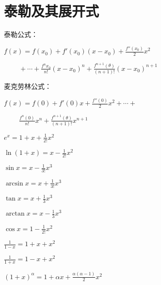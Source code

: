 \section{泰勒及其展开式}

{
    \noindent 泰勒公式：

    $\displaystyle f(x) = f(x_0) + f'(x_0)(x-x_0) + \frac{f''(x_0)}{2} x^2$

    $\displaystyle \qquad \  + \cdots + \frac{f^{n}x_0}{n!} (x-x_0)^n + \frac{f^{n+1}(\theta)}{(n+1)!}(x - x_0)^{n+1}$
}


{
    \noindent 麦克劳林公式：

    $\displaystyle f(x) = f(0) + f'(0)x + \frac{f''(0)}{2} x^2 + \cdots +$

    $\displaystyle \qquad \ \frac{f^{n}(0)}{n!} x^n + \frac{f^{n+1}(\theta)}{(n+1)!}x^{n+1}$
}

\begin{multicols}{2}
    \begin{spacing}{\hangju}
        \noindent $e^x = 1 + x + \frac{1}{2!}x^2$

        \noindent $\ln{(1 + x)} = x - \frac{1}{2!}x^2$

        \noindent $\sin{x} = x - \frac{1}{3!}x^{3}$

        \noindent $\arcsin{x} = x + \frac{1}{3!}x^{3}$

        \noindent $\tan{x} = x + \frac{1}{3}x^3$

        \noindent $\arctan{x} = x - \frac{1}{3}x^3$

        \noindent $\cos{x} = 1 - \frac{1}{2!}x^2$

        \noindent $\frac{1}{1 - x} = 1 + x + x^2$

        \noindent $\frac{1}{1 + x} = 1 - x + x^2$

        \noindent $(1 + x)^\alpha = 1 + \alpha x + \frac{\alpha(\alpha - 1)}{2}x^2$
    \end{spacing}
\end{multicols}

